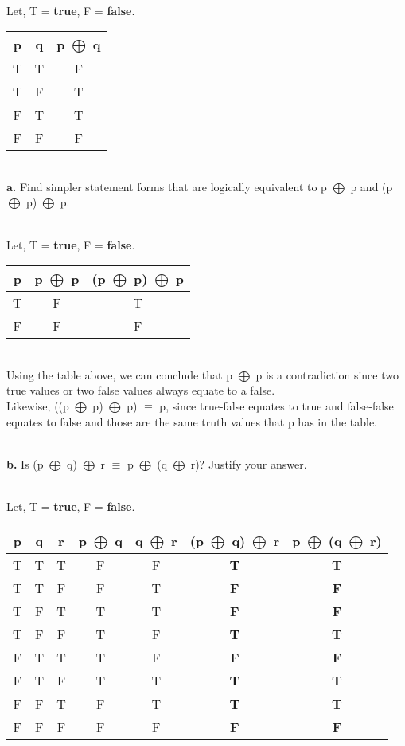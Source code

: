 \documentclass{article}
\begin{document}
\\ Let, T = \textbf{true}, F = \textbf{false}.
\begin{center}
	\begin{tabular}{ |c|c|c| } 
		\hline
		p & q & p $\bigoplus$ q \\ 
		\hline
		T & T & F \\ 
		T & F & T \\ 
		F & T & T \\ 
		F & F & F \\ 
		\hline
	\end{tabular}
\end{center}
\\ \textbf{a.} Find simpler statement forms that are logically equivalent to p $\bigoplus$ p and (p $\bigoplus$ p) $\bigoplus$ p.

\\ Let, T = \textbf{true}, F = \textbf{false}.
\begin{center}
	\begin{tabular}{ |c|c|c| } 
		\hline
		p & p $\bigoplus$ p  & (p $\bigoplus$ p) $\bigoplus$ p \\ 
		\hline
		T & F & T \\ 
		F & F & F \\ 
		\hline
	\end{tabular}
\end{center}

\\ Using the table above, we can conclude that p $\bigoplus$ p is a contradiction since two true values or two false values always equate to a false.
\\ Likewise, ((p $\bigoplus$ p) $\bigoplus$ p) $\equiv$ p, since true-false equates to true and false-false equates to false and those are the same truth values that p has in the table.


\\ \textbf{b.} Is (p $\bigoplus$ q) $\bigoplus$ r $\equiv$ p $\bigoplus$ (q $\bigoplus$ r)? Justify your answer.

\\ Let, T = \textbf{true}, F = \textbf{false}.
\begin{center}
	\begin{tabular}{ |c|c|c|c|c|c|c| } 
		\hline
		p & q & r & p $\bigoplus$ q & q $\bigoplus$ r & (p $\bigoplus$ q) $\bigoplus$ r & p $\bigoplus$ (q $\bigoplus$ r) \\ 
		\hline
		T & T & T & F & F & \textbf{T} & \textbf{T} \\ 
		T & T & F & F & T & \textbf{F} & \textbf{F} \\ 
		T & F & T & T & T & \textbf{F} & \textbf{F} \\ 
		T & F & F & T & F & \textbf{T} & \textbf{T} \\ 
		F & T & T & T & F & \textbf{F} & \textbf{F} \\ 
		F & T & F & T & T & \textbf{T} & \textbf{T} \\ 
		F & F & T & F & T & \textbf{T} & \textbf{T} \\ 
		F & F & F & F & F & \textbf{F} & \textbf{F} \\ 
		\hline
	\end{tabular}
\end{center}
\end{document}
